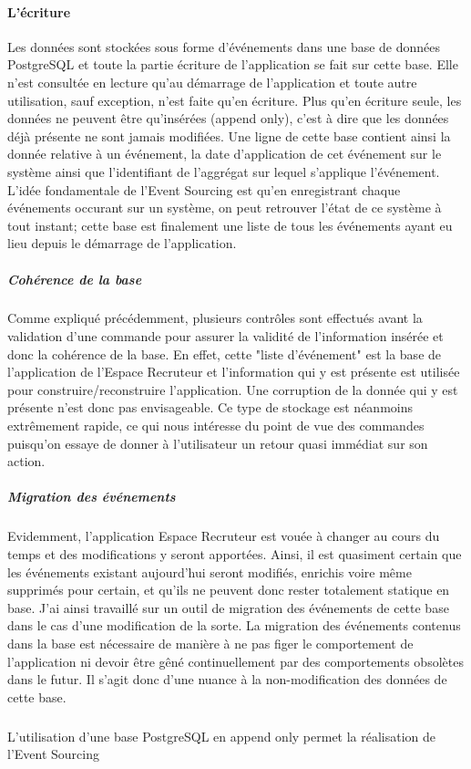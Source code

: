 \paragraph{L'écriture}
\label{par:L'écriture}
Les données sont stockées sous forme d'événements dans une base de données PostgreSQL et toute la partie écriture de l'application se fait sur cette base.
Elle n'est consultée en lecture qu'au démarrage de l'application et toute autre utilisation, sauf exception, n'est faite qu'en écriture.
Plus qu'en écriture seule, les données ne peuvent être qu'insérées (append only), c'est à dire que les données déjà présente ne sont jamais modifiées.
Une ligne de cette base contient ainsi la donnée relative à un événement, la date d'application de cet événement sur le système ainsi que l'identifiant de l'aggrégat sur lequel s'applique l'événement.
L'idée fondamentale de l'Event Sourcing est qu'en enregistrant chaque événements occurant sur un système, on peut retrouver l'état de ce système à tout instant; cette base est finalement une liste de tous les événements ayant eu lieu depuis le démarrage de l'application.
\subparagraph{Cohérence de la base}
Comme expliqué précédemment, plusieurs contrôles sont effectués avant la validation d'une commande pour assurer la validité de l'information insérée et donc la cohérence de la base.
En effet, cette "liste d'événement" est la base de l'application de l'Espace Recruteur et l'information qui y est présente est utilisée pour construire/reconstruire l'application.
Une corruption de la donnée qui y est présente n'est donc pas envisageable.
Ce type de stockage est néanmoins extrêmement rapide, ce qui nous intéresse du point de vue des commandes puisqu'on essaye de donner à l'utilisateur un retour quasi immédiat sur son action.
\subparagraph{Migration des événements}
Evidemment, l'application Espace Recruteur est vouée à changer au cours du temps et des modifications y seront apportées.
Ainsi, il est quasiment certain que les événements existant aujourd'hui seront modifiés, enrichis voire même supprimés pour certain, et qu'ils ne peuvent donc rester totalement statique en base.
J'ai ainsi travaillé sur un outil de migration des événements de cette base dans le cas d'une modification de la sorte.
La migration des événements contenus dans la base est nécessaire de manière à ne pas figer le comportement de l'application ni devoir être gêné continuellement par des comportements obsolètes dans le futur.
Il s'agit donc d'une nuance à la non-modification des données de cette base.
\subparagraph{}
L'utilisation d'une base PostgreSQL en append only permet la réalisation de l'Event Sourcing

